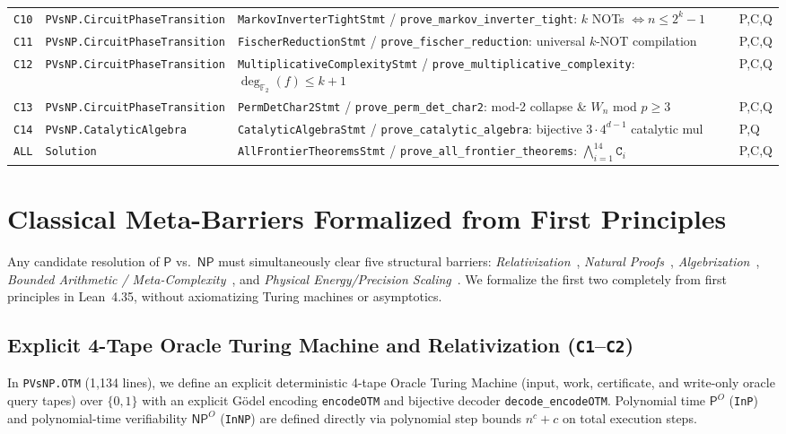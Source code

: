 \documentclass[11pt,reqno]{amsart}
\newcommand{\code}[1]{\texttt{\nolinkurl{#1}}}
\theoremstyle{definition}
\newcommand{\F}{\mathbb{F}}
\newcommand{\PP}{\mathsf{P}}
\newcommand{\NP}{\mathsf{NP}}
\begin{document}
\begin{table}[htbp]
\begin{tabularx}{\textwidth}{@{}llLl@{}}
\texttt{C10} & \code{PVsNP.CircuitPhaseTransition} & \code{MarkovInverterTightStmt} / \code{prove_markov_inverter_tight}: $k$ NOTs $\Leftrightarrow n \le 2^k-1$ & \textsf{P,C,Q} \\
\texttt{C11} & \code{PVsNP.CircuitPhaseTransition} & \code{FischerReductionStmt} / \code{prove_fischer_reduction}: universal $k$-NOT compilation & \textsf{P,C,Q} \\
\texttt{C12} & \code{PVsNP.CircuitPhaseTransition} & \code{MultiplicativeComplexityStmt} / \code{prove_multiplicative_complexity}: $\deg_{\F_2}(f)\le k+1$ & \textsf{P,C,Q} \\
\texttt{C13} & \code{PVsNP.CircuitPhaseTransition} & \code{PermDetChar2Stmt} / \code{prove_perm_det_char2}: mod-2 collapse \& $W_n$ mod $p\ge 3$ & \textsf{P,C,Q} \\
\texttt{C14} & \code{PVsNP.CatalyticAlgebra} & \code{CatalyticAlgebraStmt} / \code{prove_catalytic_algebra}: bijective $3\cdot 4^{d-1}$ catalytic mul & \textsf{P,Q} \\
\midrule
\texttt{ALL} & \code{Solution} & \code{AllFrontierTheoremsStmt} / \code{prove_all_frontier_theorems}: $\bigwedge_{i=1}^{14} \texttt{C}_i$ & \textsf{P,C,Q} \\
\bottomrule
\end{tabularx}
\end{table}

\FloatBarrier

\section{Classical Meta-Barriers Formalized from First Principles}
\label{sec:barriers}

Any candidate resolution of $\PP$ vs.\ $\NP$ must simultaneously clear five structural
barriers: \emph{Relativization}~\cite{BakerGillSolovay1975}, \emph{Natural
Proofs}~\cite{RazborovRudich1997}, \emph{Algebrization}~\cite{AaronsonWigderson2009},
\emph{Bounded Arithmetic / Meta-Complexity}~\cite{PichSanthanam2023}, and
\emph{Physical Energy/Precision Scaling}~\cite{Landauer1961,Bennett1973}. We formalize
the first two completely from first principles in Lean~4.35, without axiomatizing Turing
machines or asymptotics.

\subsection{Explicit 4-Tape Oracle Turing Machine and Relativization (\texttt{C1}--\texttt{C2})}
In \code{PVsNP.OTM} (1,134 lines), we define an explicit deterministic 4-tape Oracle
Turing Machine (input, work, certificate, and write-only oracle query tapes) over
$\{0,1\}$ with an explicit G\"odel encoding \texttt{encodeOTM} and bijective decoder
\code{decode_encodeOTM}. Polynomial time $\PP^O$ (\texttt{InP}) and polynomial-time
verifiability $\NP^O$ (\texttt{InNP}) are defined directly via polynomial step bounds
$n^c + c$ on total execution steps.
\end{document}
